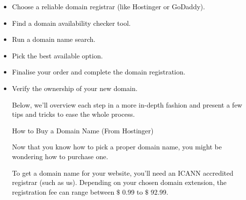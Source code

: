 \documentclass[12pt]{report}
\renewcommand{\_}{\kern-1.5pt\textunderscore\kern-1.5pt}
\begin{document}
\begin{itemize}
	\item {\fontsize{13pt}{15.6pt}\selectfont \textcolor[HTML]{0D0D0D}{Choose a reliable domain registrar (like Hostinger or GoDaddy).}\par}\par

	\item {\fontsize{13pt}{15.6pt}\selectfont \textcolor[HTML]{0D0D0D}{Find a domain availability checker tool.}\par}\par

	\item {\fontsize{13pt}{15.6pt}\selectfont \textcolor[HTML]{0D0D0D}{Run a domain name search.}\par}\par

	\item {\fontsize{13pt}{15.6pt}\selectfont \textcolor[HTML]{0D0D0D}{Pick the best available option.}\par}\par

	\item {\fontsize{13pt}{15.6pt}\selectfont \textcolor[HTML]{0D0D0D}{Finalise your order and complete the domain registration.}\par}\par

	\item {\fontsize{13pt}{15.6pt}\selectfont \textcolor[HTML]{0D0D0D}{Verify the ownership of your new domain.}\par}\par

 \tabto{0.59in} \textcolor[HTML]{0D0D0D}{Below, we’ll overview each step in a more in-depth fashion and present a few tips and tricks to ease the whole process.}\par


\vspace{\baselineskip} \tabto{0.59in} \textcolor[HTML]{0D0D0D}{How to Buy a Domain Name (From Hostinger)}\par

 \tabto{0.59in} \textcolor[HTML]{0D0D0D}{Now that you know how to pick a proper domain name, you might be wondering how to purchase one.}\par

 \tabto{0.59in} \textcolor[HTML]{0D0D0D}{To get a domain name for your website, you’ll need an ICANN accredited registrar (such as us). Depending on your chosen domain extension, the registration fee can range between $\$$ 0.99 to $\$$ 92.99.}\par



\end{itemize}
\end{document}
